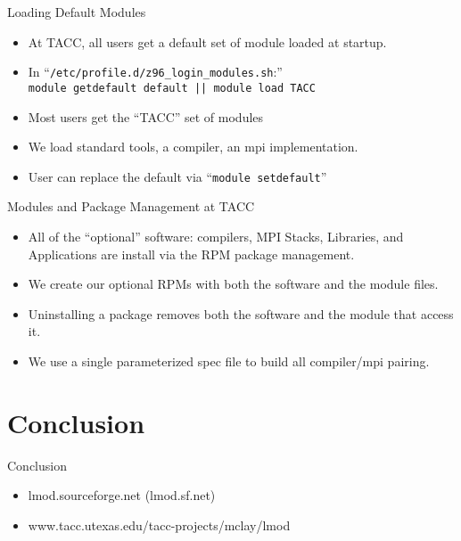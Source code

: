 \documentclass{beamer}
\begin{document}
\begin{frame}{Loading Default Modules}
  \begin{itemize}
    \item At TACC, all users get a default set of module loaded at startup.
    \item In ``\texttt{/etc/profile.d/z96\_login\_modules.sh}:'' \\
      {\color{blue}\texttt{module getdefault default || module load TACC}}
    \item Most users get the ``TACC'' set of modules
    \item We load standard tools, a compiler, an mpi implementation.
    \item User can replace the default via ``{\color{blue}\texttt{module setdefault}}''
  \end{itemize}
\end{frame}

\begin{frame}{Modules and Package Management at TACC}
  \begin{itemize}
    \item All of the ``optional'' software: compilers, MPI Stacks,
      Libraries, and Applications are install via the RPM package management.
    \item We create our optional RPMs with both the software and the
      module files.
    \item Uninstalling a package removes both the software and the
      module that access it.
    \item We use a single parameterized spec file to build all
      compiler/mpi pairing.
  \end{itemize}
\end{frame}



\section{Conclusion}

\begin{frame}{Conclusion}
  \begin{itemize}
    \item lmod.sourceforge.net (lmod.sf.net)
    \item www.tacc.utexas.edu/tacc-projects/mclay/lmod
  \end{itemize}
\end{frame}
\end{document}
